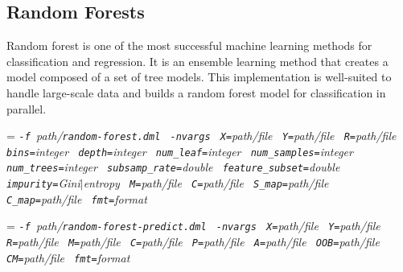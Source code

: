 \subsection{Random Forests}
\label{random_forests}

\smallskip


Random forest is one of the most successful machine learning methods for classification and regression. 
It is an ensemble learning method that creates a model composed of a set of tree models.
This implementation is well-suited to handle large-scale data and builds a random forest model for classification in parallel.\\


\smallskip
{}
\smallskip

{\hangindent=\parindent\noindent\it%
	{\tt{}-f }path/\/{\tt{}random-forest.dml}
	{\tt{} -nvargs}
	{\tt{} X=}path/file
	{\tt{} Y=}path/file
	{\tt{} R=}path/file
	{\tt{} bins=}integer
	{\tt{} depth=}integer
	{\tt{} num\_leaf=}integer
	{\tt{} num\_samples=}integer
	{\tt{} num\_trees=}integer
	{\tt{} subsamp\_rate=}double
	{\tt{} feature\_subset=}double
	{\tt{} impurity=}Gini$\mid$entropy
	{\tt{} M=}path/file
	{\tt{} C=}path/file
	{\tt{} S\_map=}path/file
	{\tt{} C\_map=}path/file
	{\tt{} fmt=}format
	
}

 \smallskip
 \smallskip
 
 {\hangindent=\parindent\noindent\it%
 	{\tt{}-f }path/\/{\tt{}random-forest-predict.dml}
 	{\tt{} -nvargs}
 	{\tt{} X=}path/file
 	{\tt{} Y=}path/file
 	{\tt{} R=}path/file
 	{\tt{} M=}path/file
 	{\tt{} C=}path/file
 	{\tt{} P=}path/file
 	{\tt{} A=}path/file
 	{\tt{} OOB=}path/file
 	{\tt{} CM=}path/file
 	{\tt{} fmt=}format
 	
 }\smallskip
 
